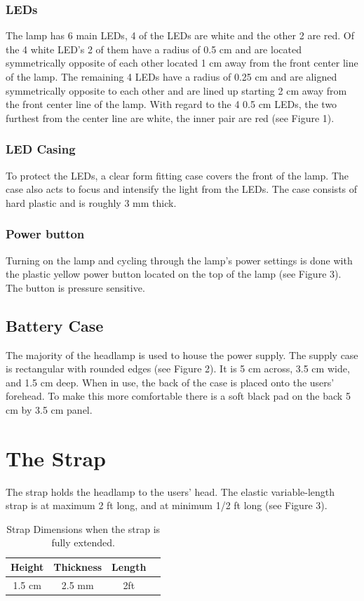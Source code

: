\documentclass[12pt]{article}
\begin{document}
\subsubsection{LEDs}
The lamp has 6 main LEDs, 4 of the LEDs are white and the other 2 are red. Of the 4 white LED's
2 of them have a radius of 0.5 cm and are located symmetrically opposite of each other located 1 cm
away from the front center line of the lamp.  The remaining 4 LEDs have a radius of 0.25 cm and are
aligned symmetrically opposite to each other and are lined up starting 2 cm away from the front
center line of the lamp. With regard to the 4 0.5 cm LEDs, the two furthest from the center line are
white, the inner pair are red (see Figure 1).

\subsubsection{LED Casing}
To protect the LEDs, a clear form fitting case covers the front of the lamp.  The case also acts to
focus and intensify the light from the LEDs. The case consists of hard plastic and is roughly
3 mm thick.

\subsubsection{Power button}
Turning on the lamp and cycling through the lamp's power settings is done with the plastic yellow
power button located on the top of the lamp (see Figure 3). The button is pressure sensitive.

\subsection{Battery Case}
The majority of the headlamp is used to house the power supply. The supply case is rectangular with
rounded edges (see Figure 2). It is 5 cm across, 3.5 cm wide, and 1.5 cm deep. When in use, the back of
the case is placed onto the users' forehead. To make this more comfortable there is a soft black
pad on the back 5 cm by 3.5 cm panel.

\section{The Strap}
The strap holds the headlamp to the users' head. The elastic variable-length strap is at maximum 2 ft
long, and at minimum 1/2 ft long (see Figure 3).
\begin{table}
\begin{center}
\begin{tabular}{ | c | c | c | p{5cm} |}
    \hline
    Height & Thickness & Length \\ \hline
    1.5 cm & 2.5 mm & 2ft  \\ \hline
\end{tabular}
\end{center}
\caption[Strap Dimensions]{Strap Dimensions when the strap is fully extended.}

\end{table}
\end{document}
